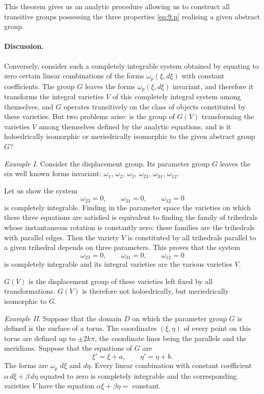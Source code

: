 \documentclass[leqno,11pt]{book}
\numberwithin{equation}{chapter}
\theoremstyle{shape1}
\theoremstyle{shapesmall}
\newcommand{\somespace}{\vspace{9pt}}
\begin{document}
\somespace

This theorem gives us an analytic procedure allowing us to construct all transitive groups possessing the three properties \eqref{eq:9.p} realising a given abstract group.

\paragraph{Discussion.}
\label{sec:117}
Conversely, consider such a completely integrable system obtained by equating to zero certain linear combinations of the forms $\omega_{p}(\xi,d\xi)$ with constant coefficients. The group $G$ leaves the forms $\omega_{p}(\xi,d\xi)$ invariant, and therefore it transforms the integral varieties $V$ of this completely integral system among themselves, and $G$ operates transitively on the class of objects constituted by these varieties. But two problems arise: is the group of $G(V)$ transforming the varieties $V$ among themselves defined by the analytic equations, and is it holoedrically isomorphic or meriedrically isomorphic to the given abstract group $G$?

\somespace

\emph{Example I}. Consider the displacement group. Its parameter group $G$ leaves the six well known forms invariant: $\omega_{1}$, $\omega_{2}$, $\omega_{3}$, $\omega_{23}$, $\omega_{31}$, $\omega_{12}$.

Let us show the system
\[
\omega_{23}=0,\qquad\omega_{31}=0,\qquad\omega_{12}=0
\]
is completely integrable. Finding in the parameter space the varieties on which these three equations are satisfied is equivalent to finding the family of trihedrals whose instantaneous rotation is constantly zero: these families are the trihedrals  with parallel edges. Then the variety $V$ is constituted by all trihedrals parallel to a given trihedral depends on three parameters. This proves that the system
\[
\omega_{23}=0,\qquad\omega_{31}=0,\qquad\omega_{12}=0
\]
is completely integrable and its integral varieties are the various varieties $V$.

$G(V)$ is the displacement group of these varieties left fixed by all transformations. $G(V)$ is therefore not holoedrically, but meriedrically isomorphic to $G$.

\somespace

\emph{Example II}. Suppose that the domain $D$ on which the parameter group $G$ is defined is the surface of a torus. The coordinates $(\xi,\eta)$ of every point on this torus are defined up to $\pm 2k\pi$, the coordinate lines being the parallels and the meridians. Suppose that the equations of $G$ are
\[
\xi'=\xi+a,\qquad\eta'=\eta+b.
\]
The forms are $\omega_{p}$ $d\xi$ and $d\eta$. Every linear combination with constant coefficient $\alpha\,d\xi+\beta\,d\eta$ equated to zero is completely integrable and the corresponding varieties $V$ have the equation $\alpha\xi+\beta\eta=$ constant.
\end{document}
